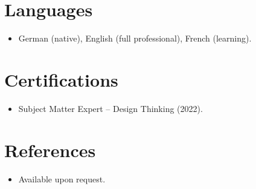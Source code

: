 \documentclass[11pt,a4paper,sans]{moderncv}
\begin{document}

\section{Languages}
\vspace{1pt}
\begin{itemize}
\item German (native), English (full professional), French (learning).
\end{itemize}


\section{Certifications}
\vspace{1pt}
\begin{itemize}
\item{Subject Matter Expert -- Design Thinking (2022).}
\end{itemize}


\section{References}
\vspace{1pt}
\begin{itemize}
\item{Available upon request.}
\end{itemize}
\end{document}
